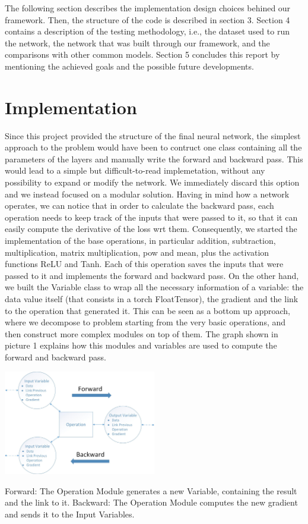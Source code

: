 \documentclass[10pt,conference,compsocconf]{IEEEtran}
\begin{document}
The following section describes the implementation design choices behined our framework. Then, the structure of the code is described in section 3. Section 4 contains a description of the testing methodology, i.e., the dataset used to run the network, the network that was built through our framework, and the comparisons with other common models. Section 5 concludes this report by mentioning the achieved goals and the possible future developments.
\section{Implementation}
	Since this project provided the structure of the final neural network, the simplest approach to the problem would have been to contruct one class containing all the parameters of the layers and manually write the forward and backward pass. This would lead to a simple but difficult-to-read implemetation, without any possibility to expand or modify the network. We immediately discard this option and we instead focused on a modular solution.
	Having in mind how a network operates, we can notice that in order to calculate the backward pass, each operation needs to keep track of the inputs that were passed to it, so that it can easily compute the derivative of the loss wrt them. Consequently, we started the implementation of the base operations, in particular addition, subtraction, multiplication, matrix multiplication, pow and mean, plus the activation functions ReLU and Tanh. Each of this operation saves the inputs that were passed to it and implements the forward and backward pass. On the other hand, we built the Variable class to wrap all the necessary information of a variable: the data value itself (that consists in a torch FloatTensor), the gradient and the link to the operation that generated it. This can be seen as a bottom up approach, where we decompose to problem starting from the very basic operations, and then construct more complex modules on top of them. The graph shown in picture 1 explains how this modules and variables are used to compute the forward and backward pass.

	\begin{center}
		\captionsetup{type=figure}
		\includegraphics[width=0.5\textwidth]{img/ForwardBackward.jpg}
		\label{fig:ForwardBackward}
		\caption {Forward: The Operation Module generates a new Variable, containing the result and the link to it. Backward: The Operation Module computes the new gradient and sends it to the Input Variables.}
	\end{center}
\end{document}
